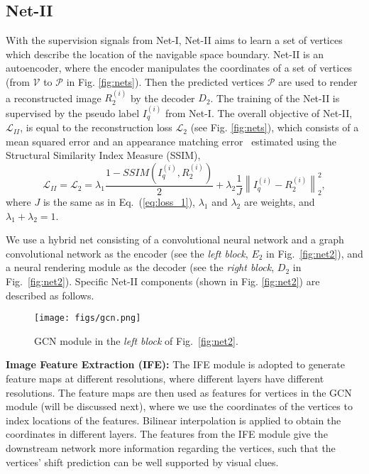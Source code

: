 \documentclass[letterpaper, 10 pt, journal, twoside]{ieeetran}
\begin{document}
\subsection{Net-II}
With the supervision signals from  Net-I,  Net-II aims to learn a set of vertices which describe the location of the navigable space boundary. Net-II is an autoencoder, where the encoder manipulates the coordinates of a set of vertices (from $\mathcal{V}$ to $\mathcal{P}$ in Fig. \ref{fig:nets}). Then the predicted vertices $\mathcal{P}$ are used to render a reconstructed image $R_2^{(i)}$ by the decoder $D_2$. The training of the Net-II is supervised by the pseudo label $I_q^{(i)}$ from  Net-I. The overall objective of Net-II, $\mathcal{L}_{II}$, is equal to the reconstruction loss $\mathcal{L}_2$ (see Fig. \ref{fig:nets}), which consists of a mean squared error and an appearance matching error~\cite{guizilini20203d} estimated using the Structural Similarity Index Measure (SSIM),
\begin{equation}
    \label{eq:loss_2_new}
    \mathcal{L}_{II} = \mathcal{L}_2 = \lambda_1 \frac{1 - SSIM(I_q^{(i)}, R_2^{(i)})}{2} + \lambda_2 \frac{1}{J}\left \|  I_q^{(i)} - R_2^{(i)}\right \|^2_2,
\end{equation}
where $J$ is the same as in Eq.~(\ref{eq:loss_1}), $\lambda_1$ and $\lambda_2$ are weights, and $\lambda_1 + \lambda_2 = 1$.

We use a hybrid net consisting of a convolutional neural network and a graph convolutional network as the encoder (see the \textit{left block}, $E_2$ in Fig.~\ref{fig:net2}), and a neural rendering module \cite{kato2018neural} as the decoder (see the \textit{right block}, $D_2$ in Fig.~\ref{fig:net2}). Specific Net-II components (shown in Fig. \ref{fig:net2}) are described as follows. 

\begin{figure} \vspace{7pt}
{
\centering
  {\texttt{[image: figs/gcn.png]} 
  } 
\caption{\small GCN module in the \textit{left block} of Fig.~\ref{fig:net2}. \vspace{-15pt}
}  
\label{fig:gcn} 
}
\end{figure}

\textbf{Image Feature Extraction (IFE):} 
The IFE module is adopted to generate feature maps at different resolutions, where different layers have different resolutions. The feature maps are then used as features for vertices in the GCN module (will be discussed next), where we use the coordinates of the vertices to index locations of the features.  Bilinear interpolation is applied to obtain the coordinates in different layers. The features from the IFE module give the downstream network more information regarding the vertices, such that the vertices' shift prediction can be well supported by visual clues. 
\end{document}
